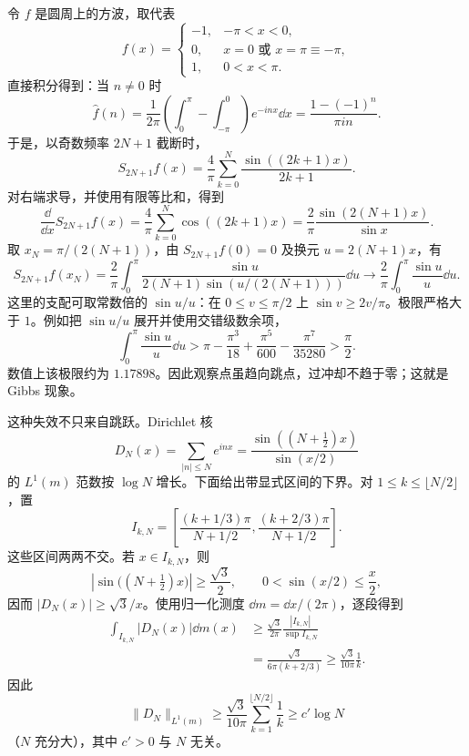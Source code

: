 \begin{example}\label{ex:7-2-1-1}
令 $f$ 是圆周上的方波，取代表
\[
 f(x)=
 \begin{cases}
   -1,&-\pi<x<0,\\
   0,&x=0\text{ 或 }x=\pi\equiv-\pi,\\
   1,&0<x<\pi.
 \end{cases}
\]
直接积分得到：当 $n\neq0$ 时
\[
 \widehat f(n)
 =\frac1{2\pi}\left(\int_0^\pi-\int_{-\pi}^0\right)e^{-inx}\dd x
 =\frac{1-(-1)^n}{\pi i n}.
\]
于是，以奇数频率 $2N+1$ 截断时，
\begin{equation}\label{eq:7-2-gibbs-partial-sum}
 S_{2N+1}f(x)=\frac4\pi\sum_{k=0}^N\frac{\sin((2k+1)x)}{2k+1}.
\end{equation}
对右端求导，并使用有限等比和，得到
\[
 \frac{\dd}{\dd x}S_{2N+1}f(x)
 =\frac4\pi\sum_{k=0}^N\cos((2k+1)x)
 =\frac2\pi\frac{\sin(2(N+1)x)}{\sin x}.
\]
取 $x_N=\pi/(2(N+1))$，由 $S_{2N+1}f(0)=0$ 及换元
$u=2(N+1)x$，有
\[
 S_{2N+1}f(x_N)
 =\frac2\pi\int_0^\pi
   \frac{\sin u}{2(N+1)\sin(u/(2(N+1)))}\dd u
 \longrightarrow \frac2\pi\int_0^\pi\frac{\sin u}{u}\dd u.
\]
这里的支配可取常数倍的 $\sin u/u$：在 $0\leq v\leq\pi/2$ 上
$\sin v\geq 2v/\pi$。极限严格大于 $1$。例如把
$\sin u/u$ 展开并使用交错级数余项，
\[
 \int_0^\pi\frac{\sin u}{u}\dd u
 >\pi-\frac{\pi^3}{18}+\frac{\pi^5}{600}
       -\frac{\pi^7}{35280}>\frac\pi2.
\]
数值上该极限约为 $1.17898$。因此观察点虽趋向跳点，过冲却不趋于零；这就是 Gibbs 现象。

这种失效不只来自跳跃。Dirichlet 核
\[
 D_N(x)=\sum_{|n|\leq N}e^{inx}
       =\frac{\sin((N+\tfrac12)x)}{\sin(x/2)}
\]
的 $L^1(m)$ 范数按 $\log N$ 增长。下面给出带显式区间的下界。对
$1\leq k\leq\lfloor N/2\rfloor$，置
\[
 I_{k,N}=\left[
   \frac{(k+1/3)\pi}{N+1/2},
   \frac{(k+2/3)\pi}{N+1/2}
 \right].
\]
这些区间两两不交。若 $x\in I_{k,N}$，则
\[
 \left|\sin\bigl((N+\tfrac12)x\bigr)\right|\geq\frac{\sqrt3}{2},
 \qquad 0<\sin(x/2)\leq\frac{x}{2},
\]
因而 $|D_N(x)|\geq\sqrt3/x$。使用归一化测度 $\dd m=\dd x/(2\pi)$，逐段得到
\begin{align*}
 \int_{I_{k,N}}|D_N(x)|\dd m(x)
 &\geq\frac{\sqrt3}{2\pi}
       \frac{|I_{k,N}|}{\sup I_{k,N}}\\
 &=\frac{\sqrt3}{6\pi(k+2/3)}
 \geq\frac{\sqrt3}{10\pi}\frac1k.
\end{align*}
因此
\[
 \|D_N\|_{L^1(m)}
 \geq\frac{\sqrt3}{10\pi}
       \sum_{k=1}^{\lfloor N/2\rfloor}\frac1k
 \geq c'\log N
\]
（$N$ 充分大），其中 $c'>0$ 与 $N$ 无关。


\end{example}
